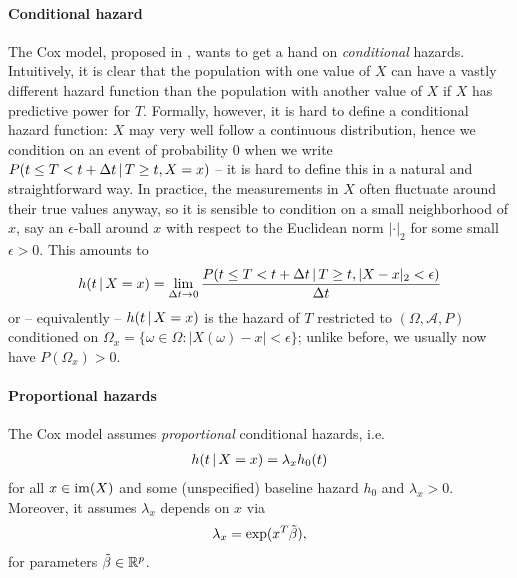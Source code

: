 \paragraph{Conditional hazard}
The Cox model, proposed in \cite{cox72}, wants to get a hand on \textit{conditional} hazards.
Intuitively, it is clear that the population with one value of $X$ can have a vastly different 
hazard function than the population with another value of $X$ if $X$ has predictive power for $T$.
Formally, however, it is hard to define a conditional hazard function: $X$ may very well 
follow a continuous distribution, hence we condition on an event of probability $0$ when we write 
$P(t \leq T < t + \Delta t \,|\, T \geq t, X = x)$ -- it is hard to define this in a natural
and straightforward way. In practice, the measurements in $X$ often fluctuate around their true 
values anyway, so it is sensible to condition on a small neighborhood of $x$, say an $\epsilon$-ball 
around $x$ with respect to the Euclidean norm $|\cdot|_2$ for some small $\epsilon > 0$. This 
amounts to
\begin{align}
    h(t \,|\, X = x) = \lim_{\Delta t \to 0} \frac{P(t \leq T < t + \Delta t \,|\, T \geq t, 
    |X - x|_2 < \epsilon)}{\Delta t}
\end{align}
or -- equivalently -- $h(t \,|\, X = x)$ is the hazard of $T$ restricted to $(\Omega, \mathcal{A}, 
P)$ conditioned on $\Omega_x = \{ \omega \in \Omega: |X(\omega) - x| < \epsilon \}$; unlike before, 
we usually now have $P(\Omega_x) > 0$.

\paragraph{Proportional hazards} The Cox model assumes \textit{proportional} conditional hazards, 
i.e. 
\begin{align}
    h(t \,|\, X = x) = \lambda_x h_0(t) 
\end{align}
for all $x \in \mathrm{im}(X)$ and some (unspecified) baseline hazard $h_0$ and $\lambda_x > 0$. 
Moreover, it assumes $\lambda_x$ depends on $x$ via 
\begin{align}\label{eq:cox-proportional-factor}
    \lambda_x = \exp(x^T \tilde{\beta}),
\end{align}
for parameters $\tilde{\beta} \in \mathbb{R}^p$.


